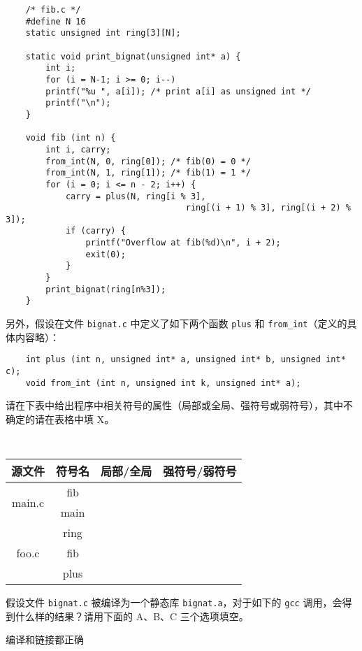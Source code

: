 \begin{problems}
\begin{verbatim}
    /* fib.c */
    #define N 16
    static unsigned int ring[3][N];

    static void print_bignat(unsigned int* a) {
        int i;
        for (i = N-1; i >= 0; i--)
        printf("%u ", a[i]); /* print a[i] as unsigned int */
        printf("\n");
    }

    void fib (int n) {
        int i, carry;
        from_int(N, 0, ring[0]); /* fib(0) = 0 */
        from_int(N, 1, ring[1]); /* fib(1) = 1 */
        for (i = 0; i <= n - 2; i++) {
            carry = plus(N, ring[i % 3],
                                    ring[(i + 1) % 3], ring[(i + 2) % 3]);
            if (carry) {
                printf("Overflow at fib(%d)\n", i + 2);
                exit(0);
            }
        }
        print_bignat(ring[n%3]);
    }
        \end{verbatim}
        另外，假设在文件 \verb|bignat.c| 中定义了如下两个函数 \verb|plus| 和 \verb|from_int|（定义的具体内容略）：
        \begin{verbatim}
    int plus (int n, unsigned int* a, unsigned int* b, unsigned int* c);
    void from_int (int n, unsigned int k, unsigned int* a);
        \end{verbatim}
        \qn 请在下表中给出程序中相关符号的属性（局部或全局、强符号或弱符号），其中不确定的请在表格中填 X。
        \begin{table}[H]
            \tt
            \centering
            \begin{tabular}{|c|c|c|c|}
                \hline
                源文件 & 符号名 & {\qquad \qquad 局部/全局 \qquad \qquad} & {\qquad \qquad 强符号/弱符号 \qquad \qquad} \\ \hline
                \multirow{2}{*}{main.c} & fib &  &  \\ \cline{2-4} 
                & main &  &  \\ \hline
                \multirow{3}{*}{foo.c} & ring &  &  \\ \cline{2-4} 
                & fib &  &  \\ \cline{2-4} 
                & plus &  &  \\ \hline
            \end{tabular}
        \end{table}
        \qn 假设文件 \verb|bignat.c| 被编译为一个静态库 \verb|bignat.a|，对于如下的 \verb|gcc| 调用，会得到什么样的结果？请用下面的 A、B、C 三个选项填空。
        \begin{choices}
            \item 编译和链接都正确

\end{choices}
\end{problems}
